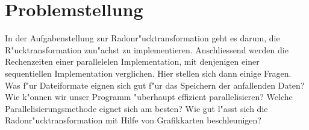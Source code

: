 \section{Problemstellung}

In der Aufgabenstellung zur Radonr"ucktransformation geht es darum, die
R"ucktransformation zun"achst zu implementieren. Anschliessend werden
die Rechenzeiten einer parallelelen Implementation, mit denjenigen
einer sequentiellen Implementation verglichen. Hier stellen sich dann
einige Fragen.
Was f"ur Dateiformate eignen sich gut f"ur das Speichern der
anfallenden Daten? Wie k"onnen wir unser Programm "uberhaupt effizient
parallelisieren? Welche Parallelisierungsmethode eignet sich am
besten? Wie gut l"asst sich die Radonr"ucktransformation mit Hilfe von
Grafikkarten beschleunigen?

